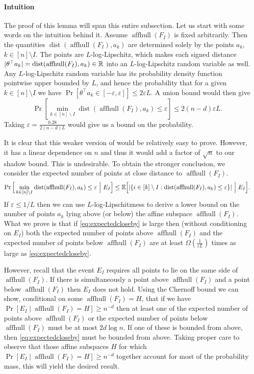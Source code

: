 \documentclass{theoretics}
\newcommand{\R}{\mathbb R}
\newcommand{\E}{\mathbb E}
\newcommand{\aff}{\operatorname{affhull}}
\newcommand{\eps}{\varepsilon} %
\newcommand{\dist}{\operatorname{dist}}
\DeclarePairedDelimiter\abs{\lvert}{\rvert}
\begin{document}
\paragraph{Intuition}
The proof of this lemma will span this entire subsection.
Let us start with some words on the intuition behind it.
Assume $\aff(F_I)$ is fixed arbitrarily. Then the quantities $\dist(\aff(F_I),a_k)$
are determined solely by the points $a_k$, $k \in [n]\setminus I$.
The points are $L$-log-Lipschitz, which makes each signed distance $\abs{\theta^\top a_k} = \dist(\aff(F_I), a_k) \in \R$
into an $L$-log-Lipschitz random variable as well.
Any $L$-log-Lipschitz random variable has its probability density function pointwise upper bounded by $L$,
and hence the probability that for a given $k \in [n]\setminus I$ we have
$\Pr[\theta^\top a_k \in [-\eps, \eps]] \leq 2\eps L$.
A union bound would then give
\[\Pr[\min_{k \in [n] \backslash I}\dist(\aff(F_I), a_k)\leq\eps] \leq 2(n-d)\eps L.\]
Taking $\eps = \frac{0.28}{2(n-d)L}$ would give us a bound on the probability.

It is clear that this weaker version of  would be relatively easy to prove.
However, it has a linear dependence on $n$ and thus it would add a factor of $\sqrt{n}$ to our shadow bound.
This is undesirable.
To obtain the stronger conclusion, we consider the expected number of points
at close distance to $\aff(F_I)$.
\begin{equation}
\Pr\Big[\min_{k \in [n] \backslash I}\dist(\aff(F_I), a_k) \leq \eps ~\Big|~ E_I\Big]
\leq
\E\Big[\abs{\{i \in [k]\setminus I : \dist(\aff(F_I),a_k) \leq \eps \}} ~\Big|~ E_I\Big].\label{eq:expectedcloseby}
\end{equation}
If $\eps \leq 1/L$ then we can use $L$-log-Lipschitzness to derive a lower bound on the number of points $a_k$
lying above (or below) the affine subspace $\aff(F_I)$.
What we prove is that if \eqref{eq:expectedcloseby} is large then (without conditioning on $E_I$)
both the expected number of points above $\aff(F_I)$ and the expected number of points below $\aff(F_I)$
are at least $\Omega(\frac{1}{\eps L})$ times as large as \eqref{eq:expectedcloseby}.

However, recall that the event $E_I$ requires all points to lie on the same side of $\aff(F_I)$.
If there is simultaneously a point above $\aff(F_I)$ and a point below $\aff(F_I)$ then $E_I$ does not hold.
Using the Chernoff bound we can show, conditional on some $\aff(F_I) = H$, that if we have
$\Pr[E_I \mid \aff(F_I) = H] \geq n^{-d}$
then at least one of the expected number of points above $\aff(F_I)$ or the expected number of points below
$\aff(F_I)$ must be at most $2d \log n$.
If one of these is bounded from above, then \eqref{eq:expectedcloseby} must be bounded from above.
Taking proper care to observe that those affine subspaces $H$ for which $\Pr[E_I \mid \aff(F_I) = H] \geq n^{-d}$
together account for most of the probability mass, this will yield the desired result.
\end{document}

